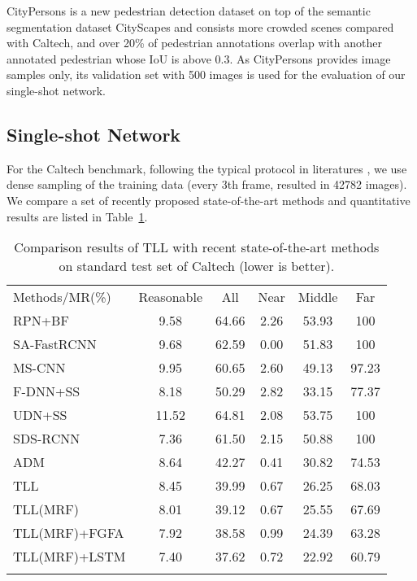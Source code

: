 \documentclass[runningheads]{llncs}
\begin{document}
CityPersons is a new pedestrian detection dataset on top of the semantic segmentation dataset CityScapes \cite{CityScapes} and consists more crowded scenes compared with Caltech, and over 20\% of pedestrian annotations overlap with another annotated pedestrian whose IoU is above 0.3. As CityPersons provides image samples only, its validation set with 500 images is used for the evaluation of our single-shot network.

\subsection{Single-shot Network}
For the Caltech benchmark, following the typical protocol in literatures \cite{FRCNNPD,SAFRCNN,MSCNN}, we use dense sampling of the training data (every 3th frame, resulted in 42782 images). We compare a set of recently proposed state-of-the-art methods and quantitative results are listed in Table~\ref{Cal_res_tab}.
\setlength{\tabcolsep}{4pt}
\begin{table}[t]
	\begin{center}
		\caption{Comparison results of TLL with recent state-of-the-art methods on standard test set of Caltech (lower is better).}
		\label{Cal_res_tab}
		\begin{tabular}{lccccc}
			\hline\noalign{\smallskip}
			Methods/MR(\%) & Reasonable & All & Near & Middle & Far\\
			\noalign{\smallskip}
			\hline
			\noalign{\smallskip}
			RPN+BF \cite{FRCNNPD}  & 9.58 & 64.66 & 2.26 & 53.93 & 100\\
			SA-FastRCNN \cite{SAFRCNN}  & 9.68 & 62.59 & 0.00 & 51.83 & 100\\
			MS-CNN \cite{MSCNN}  & 9.95 & 60.65 & 2.60 & 49.13 & 97.23\\
			F-DNN+SS \cite{FDNN}  & 8.18 & 50.29 & 2.82 & 33.15 & 77.37\\
			UDN+SS \cite{UDN}  & 11.52 & 64.81 & 2.08 & 53.75 & 100\\
			SDS-RCNN \cite{SDSRCNN}  & 7.36 & 61.50 & 2.15 & 50.88 & 100\\
			ADM \cite{ADM}  & 8.64 & 42.27 & 0.41 & 30.82 & 74.53\\
			TLL  & 8.45 & 39.99 & 0.67 & 26.25 & 68.03\\
			TLL(MRF)  & 8.01 & 39.12 & 0.67 & 25.55 & 67.69\\
			\noalign{\smallskip}
			\hline
			\noalign{\smallskip}
			TLL(MRF)+FGFA \cite{FGFA}  & 7.92 & 38.58 & 0.99 & 24.39 & 63.28\\
			TLL(MRF)+LSTM  & 7.40 & 37.62 & 0.72 & 22.92 & 60.79\\	
			\noalign{\smallskip}		
			\hline
		\end{tabular}
	\end{center}
\end{table}
\setlength{\tabcolsep}{1.4pt}
\end{document}
